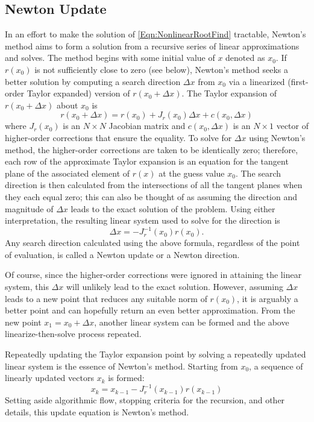 \documentclass[Prelim,12pt]{WisconsinThesis}
\newcommand{\by}    {\!\times\!}
\begin{document}
\subsection{Newton Update}
In an effort to make the solution of \cref{Eqn:NonlinearRootFind} tractable, Newton's method aims to form a solution from a recursive series of linear approximations and solves.
The method begins with some initial value of $x$ denoted as $x_0$.
If $r(x_0)$ is not sufficiently close to zero (see below), Newton's method seeks a better solution by computing a search direction $\Delta{x}$ from $x_0$ via a linearized (first-order Taylor expanded) version of $r(x_0 + \Delta{x})$.
The Taylor expansion of $r(x_0 + \Delta{x})$ about $x_0$ is
\begin{equation}
    r(x_0 + \Delta{x}) =  r(x_0) + J_r(x_0)\Delta{x} + c(x_0,\Delta{x})
\end{equation}
where $J_r(x_0)$ is an $N \by N$ Jacobian matrix and $c(x_0,\Delta{x})$ is an $N \by 1$ vector of higher-order corrections that ensure the equality.
To solve for $\Delta{x}$ using Newton's method, the higher-order corrections are taken to be identically zero; therefore, each row of the approximate Taylor expansion is an equation for the tangent plane of the associated element of $r(x)$ at the guess value $x_0$.
The search direction is then calculated from the intersections of all the tangent planes when they each equal zero; this can also be thought of as assuming the direction and magnitude of $\Delta{x}$ leads to the exact solution of the problem.
Using either interpretation, the resulting linear system used to solve for the direction is
\begin{equation}
    \Delta{x} = - J_{r}^{-1}(x_0) r(x_0).
\end{equation}
Any search direction calculated using the above formula, regardless of the point of evaluation, is called a Newton update or a Newton direction.

Of course, since the higher-order corrections were ignored in attaining the linear system, this $\Delta{x}$ will unlikely lead to the exact solution.
However, assuming $\Delta{x}$ leads to a new point that reduces any suitable norm of $r(x_0)$, it is arguably a better point and can hopefully return an even better approximation.
From the new point $x_1 = x_0 + \Delta{x}$, another linear system can be formed and the above linearize-then-solve process repeated.

Repeatedly updating the Taylor expansion point by solving a repeatedly updated linear system is the essence of Newton's method.
Starting from $x_0$, a sequence of linearly updated vectors $x_k$ is formed:
\begin{equation}
    x_k = x_{k-1} - J_r^{-1}(x_{k-1}) r(x_{k-1})
\end{equation}
Setting aside algorithmic flow, stopping criteria for the recursion, and other details, this update equation is Newton's method.
\end{document}
